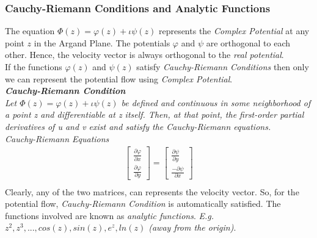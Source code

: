 \documentclass{book}
\begin{document}
\subsubsection{Cauchy-Riemann Conditions and Analytic Functions}
The equation $\Phi(z)=\varphi(z)+\iota\psi(z)$ represents the \emph{Complex Potential} at any point $z$ in the Argand Plane. The potentials $\varphi$ and $\psi$ are orthogonal to each other. Hence, the velocity vector is always orthogonal to the \emph{real potential}. \\
If the functions $\varphi(z)$ and $\psi(z)$ satisfy \emph{Cauchy-Riemann Conditions} then only we can represent the potential flow using \emph{Complex Potential}.
\vspace{0.2cm}
\\
\textbf{\emph{Cauchy-Riemann Condition}}
\\
\textit{Let $\Phi(z)=\varphi(z)+\iota\psi(z)$ be defined and continuous in some neighborhood of a point z and differentiable at z itself. Then, at that point, the first-order partial derivatives of u and v exist and satisfy the Cauchy-Riemann equations.}\\
\emph{Cauchy-Riemann Equations}\textemdash
\begin{equation*}
\begin{split}
 \begin{bmatrix}\frac{\partial \varphi}{\partial x}\\[0.3cm]\frac{\partial \varphi}{\partial y}\end{bmatrix}=\begin{bmatrix}\frac{\partial \psi}{\partial y}\\[0.3cm]\frac{-\partial \psi}{\partial x}\end{bmatrix}\\
\end{split}
\end{equation*}
Clearly, any of the two matrices, can represents the velocity vector. So, for the potential flow, \emph{Cauchy-Riemann Condition} is automatically satisfied. The functions involved are known as \emph{analytic functions}. \textit{E.g. $z^2,z^3,...,cos(z),sin(z), e^z, ln(z)$ (away from the origin)}. \\
\vspace{0.3cm}
\\
\end{document}
